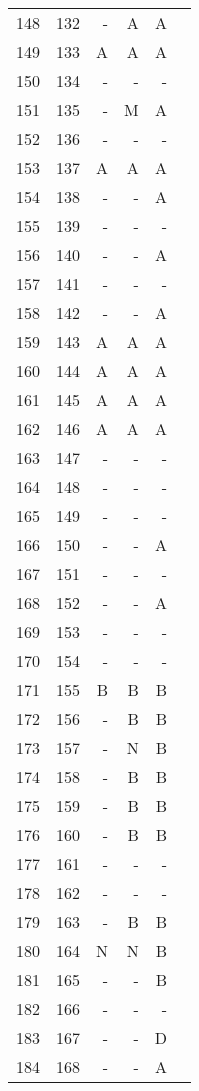 \begin{longtable}{rrrrrr}
  148 & 132 & - & A & A &  \\ 
  149 & 133 & A & A & A &  \\ 
  150 & 134 & - & - & - &  \\ 
  151 & 135 & - & M & A &  \\ 
  152 & 136 & - & - & - &  \\ 
  153 & 137 & A & A & A &  \\ 
  154 & 138 & - & - & A &  \\ 
  155 & 139 & - & - & - &  \\ 
  156 & 140 & - & - & A &  \\ 
  157 & 141 & - & - & - &  \\ 
  158 & 142 & - & - & A &  \\ 
  159 & 143 & A & A & A &  \\ 
  160 & 144 & A & A & A &  \\ 
  161 & 145 & A & A & A &  \\ 
  162 & 146 & A & A & A &  \\ 
  163 & 147 & - & - & - &  \\ 
  164 & 148 & - & - & - &  \\ 
  165 & 149 & - & - & - &  \\ 
  166 & 150 & - & - & A &  \\ 
  167 & 151 & - & - & - &  \\ 
  168 & 152 & - & - & A &  \\ 
  169 & 153 & - & - & - &  \\ 
  170 & 154 & - & - & - &  \\ 
  171 & 155 & B & B & B &  \\ 
  172 & 156 & - & B & B &  \\ 
  173 & 157 & - & N & B &  \\ 
  174 & 158 & - & B & B &  \\ 
  175 & 159 & - & B & B &  \\ 
  176 & 160 & - & B & B &  \\ 
  177 & 161 & - & - & - &  \\ 
  178 & 162 & - & - & - &  \\ 
  179 & 163 & - & B & B &  \\ 
  180 & 164 & N & N & B &  \\ 
  181 & 165 & - & - & B &  \\ 
  182 & 166 & - & - & - &  \\ 
  183 & 167 & - & - & D &  \\ 
  184 & 168 & - & - & A &  \\ 

\end{longtable}
